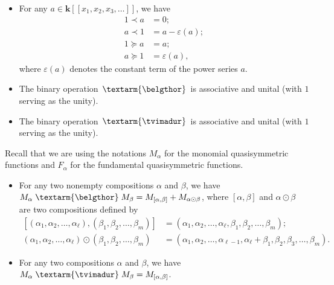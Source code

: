 \documentclass[numbers=enddot,12pt,final,onecolumn,notitlepage]{scrartcl}%
\theoremstyle{definition}
\newenvironment{verlong}{}{}
\newcommand{\tvi}{\left. \textarm{\tvimadur} \right.}
\newcommand{\bel}{\left. \textarm{\belgthor} \right.}
\begin{document}
\begin{verlong}
\begin{itemize}
\item For any $a\in\mathbf{k}\left[  \left[  x_{1},x_{2},x_{3},\ldots\right]
\right]  $, we have%
\begin{align}
1\left.  \prec\right.  a  &  =0;\label{eq.dendriform.1<a}\\
a\left.  \prec\right.  1  &  =a-\varepsilon\left(  a\right)
;\label{eq.dendriform.a<1}\\
1\left.  \succeq\right.  a  &  =a;\label{eq.dendriform.1>=a}\\
a\left.  \succeq\right.  1  &  =\varepsilon\left(  a\right)  ,
\label{eq.dendriform.a>=1}%
\end{align}
where $\varepsilon\left(  a\right)  $ denotes the constant term of the power
series $a$.

\item The binary operation $\bel$ is associative and unital (with $1$ serving
as the unity).

\item The binary operation $\tvi$ is associative and unital (with $1$ serving
as the unity).
\end{itemize}

Recall that we are using the notations $M_{\alpha}$ for the monomial
quasisymmetric functions and $F_{\alpha}$ for the fundamental quasisymmetric functions.

\begin{itemize}
\item For any two nonempty compositions $\alpha$ and $\beta$, we have
$M_{\alpha}\bel  M_{\beta}=M_{\left[  \alpha,\beta\right]  }+M_{\alpha
\odot\beta}$, where $\left[  \alpha,\beta\right]  $ and $\alpha\odot\beta$ are
two compositions defined by%
\begin{align*}
\left[  \left(  \alpha_{1},\alpha_{2},\ldots,\alpha_{\ell}\right)  ,\left(
\beta_{1},\beta_{2},\ldots,\beta_{m}\right)  \right]   &  =\left(  \alpha
_{1},\alpha_{2},\ldots,\alpha_{\ell},\beta_{1},\beta_{2},\ldots,\beta
_{m}\right)  ;\\
\left(  \alpha_{1},\alpha_{2},\ldots,\alpha_{\ell}\right)  \odot\left(
\beta_{1},\beta_{2},\ldots,\beta_{m}\right)   &  =\left(  \alpha_{1}%
,\alpha_{2},\ldots,\alpha_{\ell-1},\alpha_{\ell}+\beta_{1},\beta_{2},\beta
_{3},\ldots,\beta_{m}\right)  .
\end{align*}


\item For any two compositions $\alpha$ and $\beta$, we have $M_{\alpha
}\tvi  M_{\beta}=M_{\left[  \alpha,\beta\right]  }$.


\end{itemize}
\end{verlong}
\end{document}
